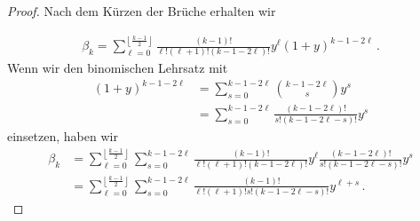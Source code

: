 \documentclass[../Bachelor_LennartKoliwer.tex]{subfiles}
\begin{document}
\begin{proof}
    Nach dem Kürzen der Brüche erhalten wir 

    \begin{align*}
        \beta_k = \sum_{\ell=0}^{\left\lfloor\frac{k-1}{2}\right\rfloor} \frac{(k-1)!}{\ell!(\ell+1)!(k-1-2\ell)!}y^\ell(1+y)^{k-1-2\ell}\,.
    \end{align*}
    Wenn wir den binomischen Lehrsatz mit 
    \begin{align*}
        (1+y)^{k-1-2\ell} &= \sum_{s=0}^{k-1-2\ell}\binom{k-1-2\ell}{s}y^s\\
        &= \sum_{s=0}^{k-1-2\ell}\frac{(k-1-2\ell)!}{s!(k-1-2\ell-s)!}y^s
    \end{align*}
    einsetzen, haben wir 
    \begin{align*}
        \beta_k &= \sum_{\ell=0}^{\left\lfloor\frac{k-1}{2}\right\rfloor}\sum_{s=0}^{k-1-2\ell} \frac{(k-1)!}{\ell!(\ell+1)!(k-1-2\ell)!}y^\ell\frac{(k-1-2\ell)!}{s!(k-1-2\ell-s)!}y^s \\
        &= \sum_{\ell=0}^{\left\lfloor\frac{k-1}{2}\right\rfloor}\sum_{s=0}^{k-1-2\ell} \frac{(k-1)!}{\ell!(\ell+1)!s!(k-1-2\ell-s)!}y^{\ell+s}\,.
    \end{align*}


\end{proof}
\end{document}
